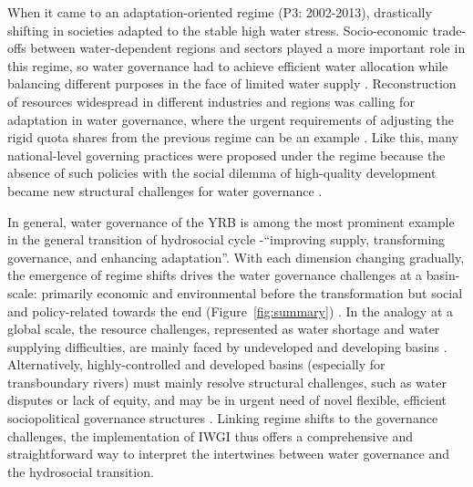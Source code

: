 When it came to an adaptation-oriented regime (P3: 2002-2013), drastically shifting in societies adapted to the stable high water stress.
Socio-economic trade-offs between water-dependent regions and sectors played a more important role in this regime, so water governance had to achieve efficient water allocation while balancing different purposes in the face of limited water supply
\cite{dalin2015,song2022}.
Reconstruction of resources widespread in different industries and regions was calling for adaptation in water governance, where the urgent requirements of adjusting the rigid quota shares from the previous regime can be an example \cite{wang2019a}.
Like this, many national-level governing practices were proposed under the regime because the absence of such policies with the social dilemma of high-quality development became new structural challenges for water governance
\cite{konar2019}.

In general, water governance of the YRB is among the most prominent example in the general transition of hydrosocial cycle -``improving supply, transforming governance, and enhancing adaptation''.
With each dimension changing gradually, the emergence of regime shifts drives the water governance challenges at a basin-scale: primarily economic and environmental before the transformation but social and policy-related towards the end (Figure~\ref{fig:summary}) \cite{singh2019,porcher2019}.
In the analogy at a global scale, the resource challenges, represented as water shortage and water supplying difficulties, are mainly faced by undeveloped and developing basins
\cite{allan2019,speed2013,liu2012a}.
Alternatively, highly-controlled and developed basins (especially for transboundary rivers) must mainly resolve structural challenges, such as water disputes or lack of equity, and may be in urgent need of novel flexible, efficient sociopolitical governance structures %
\cite{unep-dhi2016,mirumachi2015}.
Linking regime shifts to the governance challenges, the implementation of IWGI thus offers a comprehensive and straightforward way to interpret the intertwines between water governance and the hydrosocial transition.


